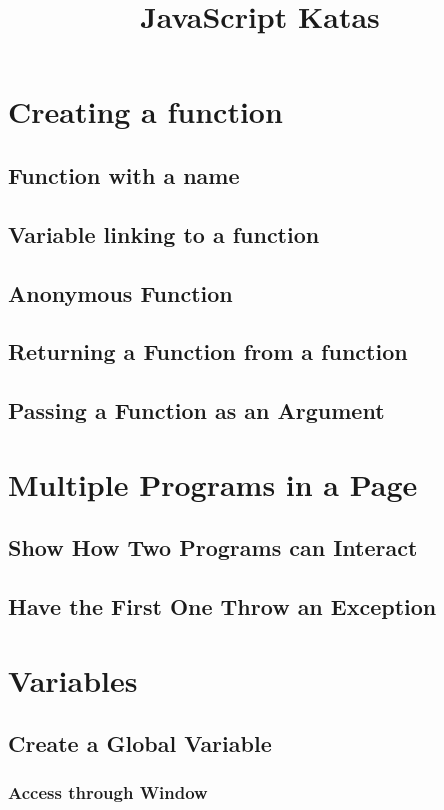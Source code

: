 \documentclass {amsart}
\title{JavaScript Katas}
\begin{document}
\maketitle

\section{Creating a function}
	\subsection{Function with a name}
	\subsection{Variable linking to a function}
	\subsection{Anonymous Function}
	\subsection{Returning a Function from a function}
	\subsection{Passing a Function as an Argument}

\section{Multiple Programs in a Page}
	\subsection{Show How Two Programs can Interact}
	\subsection{Have the First One Throw an Exception}

\section{Variables}
	\subsection{Create a Global Variable}
		\subsubsection{Access through Window}
\end{document}
